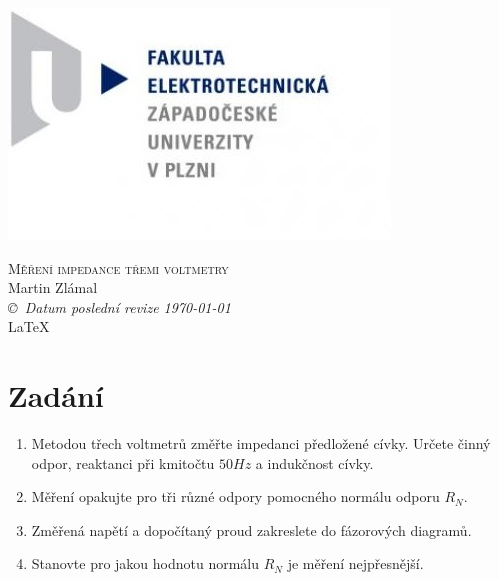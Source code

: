 \documentclass[12pt]{article} %
\newcommand{\bigsize}{\fontsize{35pt}{20pt}\selectfont}
\begin{document}
\begin{titlepage}
	\includegraphics[scale=0.7]{logo.jpg}
	\vspace*{\fill}
	\begin{center}
		\textsc{\LARGE \bigsize Měření impedance třemi voltmetry}\\[1cm]
		Martin Zlámal \\[1cm]
		{\small\em \copyright \ Datum poslední revize \today } \\
		\LaTeX
	\end{center}
	\vspace*{\fill}
\end{titlepage}
\tableofcontents
\listoffigures
\listoftables
\newpage

\section{Zadání}
\begin{enumerate}
\item Metodou třech voltmetrů změřte impedanci předložené cívky. Určete činný odpor,
reaktanci při kmitočtu $50Hz$ a indukčnost cívky.
\item Měření opakujte pro tři různé odpory pomocného normálu odporu $R_N$.
\item Změřená napětí a dopočítaný proud zakreslete do fázorových diagramů.
\item Stanovte pro jakou hodnotu normálu $R_N$ je měření nejpřesnější.
\end{enumerate}
\end{document}
